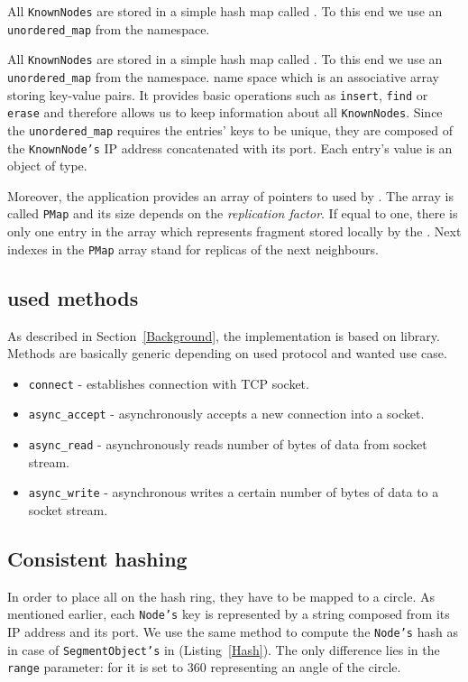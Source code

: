         All \texttt{KnownNodes} are stored in a simple hash map called \NodesMap.
        To this end we use an \texttt{unordered\_map} \cite{Unordered} from the \std namespace.
        
        
        All \texttt{KnownNodes} are stored in a simple hash map called \NodesMap.
        To this end we use an \texttt{unordered\_map} \cite{Unordered} from the \std namespace.
    name space which is an associative array storing key-value pairs.
        It provides basic operations such as \texttt{insert}, \texttt{find} or \texttt{erase} and therefore allows us to keep information about all \texttt{KnownNodes}.
        Since the \texttt{unordered\_map} requires the entries' keys to be unique, they are composed of the \texttt{KnownNode's} IP address concatenated with its port. 
        Each entry's value is an object of \KnownNode type.
        
        Moreover, the application provides an array of pointers to \PHT used by \Node.
        The array is called \texttt{PMap} and its size depends on the \textit{replication factor}.
        If equal to one, there is only one entry in the array which represents \PHT fragment stored locally by the \Node.
        Next indexes in the \texttt{PMap} array stand for replicas of the next \Node neighbours.

    \subsection{\Asio used methods}
        As described in Section~\ref{Background}, the \DHTS implementation is based on \Asio library.
        Methods are basically generic depending on used protocol and wanted use case.
        \begin{itemize}
            \item \texttt{connect} - establishes connection with TCP socket.
            \item \texttt{async\_accept} - asynchronously accepts a new connection into a socket.
            \item \texttt{async\_read} - asynchronously reads number of bytes of data from socket stream.
            \item \texttt{async\_write} - asynchronous writes a certain number of bytes of data to a socket stream.
        \end{itemize}
        
                
    \subsection{Consistent hashing} \label{ConsistentHashing}
        In order to place all \Nodes on the hash ring, they have to be mapped to a circle.
        As mentioned earlier, each \texttt{Node's} key is represented by a string composed from its IP address and its port. 
        We use the same method to compute the \texttt{Node's} hash as in case of \texttt{SegmentObject's} in \PHT (Listing~\ref{Hash}).
        The only difference lies in the \texttt{range} parameter: for \Nodes it is set to 360 representing an angle of the circle.
            
